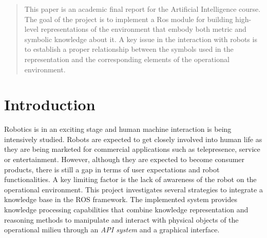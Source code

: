 \begin{abstract}
This paper is an academic final report for the Artificial Intelligence course. The goal of the project is to implement a Ros module for building high-level representations of the environment that embody both metric and symbolic knowledge about it. A key issue in the interaction with robots is to establish a proper relationship between the symbols used in the representation and the corresponding elements of the operational environment.
\end{abstract}	

\section{Introduction}

Robotics is in an exciting stage and human machine interaction is being intensively studied.
Robots are expected to get closely involved into human life as they are being marketed for commercial applications such as telepresence, service or entertainment. However, although they are expected to become consumer products, there is still a gap in terms of user expectations and robot functionalities. A key limiting factor is the lack of awareness of the robot on the operational environment.
This project investigates several strategies to integrate a knowledge base in the ROS framework. The implemented system provides knowledge processing capabilities that combine knowledge representation and reasoning methods to manipulate and interact with physical objects of the operational milieu through an \textit{API system} and a graphical interface.\\







